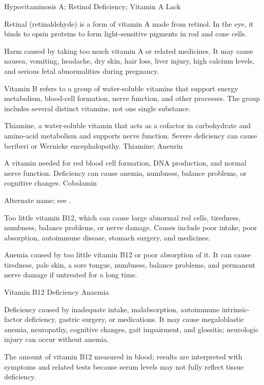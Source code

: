 \synonyms
Hypovitaminosis A; Retinol Deficiency; Vitamin A Lack

 Retinal (retinaldehyde) is a form of vitamin A made from retinol. In the eye, it binds to opsin proteins to form light-sensitive pigments in rod and cone cells.

 Harm caused by taking too much vitamin A or related medicines. It may cause nausea, vomiting, headache, dry skin, hair loss, liver injury, high calcium levels, and serious fetal abnormalities during pregnancy.

 Vitamin B refers to a group of water-soluble vitamins that support energy metabolism, blood-cell formation, nerve function, and other processes. The group includes several distinct vitamins, not one single substance.

 Thiamine, a water-soluble vitamin that acts as a cofactor in carbohydrate and amino-acid metabolism and supports nerve function. Severe deficiency can cause beriberi or Wernicke encephalopathy.
\synonyms
Thiamine; Aneurin

 A vitamin needed for red blood cell formation, DNA production, and normal nerve function. Deficiency can cause anemia, numbness, balance problems, or cognitive changes.
\synonyms
Cobalamin

 Alternate name; see .

 Too little vitamin B12, which can cause large abnormal red cells, tiredness, numbness, balance problems, or nerve damage. Causes include poor intake, poor absorption, autoimmune disease, stomach surgery, and medicines.

 Anemia caused by too little vitamin B12 or poor absorption of it. It can cause tiredness, pale skin, a sore tongue, numbness, balance problems, and permanent nerve damage if untreated for a long time.

\synonyms
Vitamin B12 Deficiency Anaemia

 Deficiency caused by inadequate intake, malabsorption, autoimmune intrinsic-factor
deficiency, gastric surgery, or medications. It may cause megaloblastic anemia,
neuropathy, cognitive changes, gait impairment, and glossitis; neurologic injury can
occur without anemia.

 The amount of vitamin B12 measured in blood; results are interpreted with symptoms and related tests because serum levels may not fully reflect tissue deficiency.

